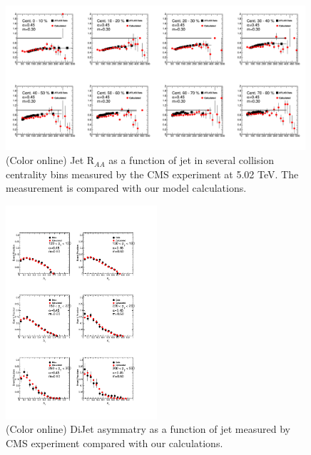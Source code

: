 \documentclass[reprint,amsmath,amssymb,aps,showpacs,showkeys]{revtex4}
\begin{document}
\begin{figure}
  \includegraphics[width=0.99\textwidth]{Figures/Fig_RAA_Jet_Centrality_502TeV.pdf}
  \caption{(Color online) Jet R$_{AA}$ as  a function of jet \pt in several collision centrality bins
    measured by the CMS experiment at 5.02 TeV. The measurement is compared with our model calculations.}
  \label{Fig:JetRAAPt_ATLAS_276TeV}
\end{figure}




\begin{figure}
  \includegraphics[width=0.5\textwidth]{Figures/Fig_Asym_DiJet_Pt.pdf}
  \caption{(Color online) DiJet asymmatry as a function of jet \pt measured by CMS experiment
    compared with our calculations.}
  \label{Fig:DiJetAsymPt}
\end{figure}
\end{document}
